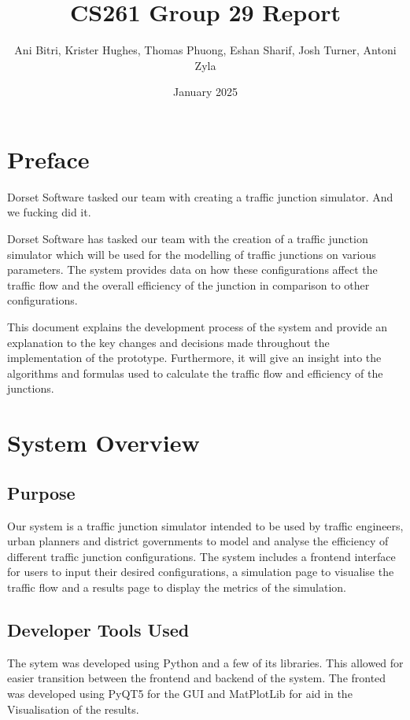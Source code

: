 \documentclass{article}
\title{\vspace{-1.5cm}CS261 Group 29 Report}
\author{Ani Bitri, Krister Hughes, Thomas Phuong, Eshan Sharif, Josh Turner, Antoni Zyla}
\date{January 2025}
\begin{document}
    \maketitle

    \section{Preface}

    Dorset Software tasked our team with creating a traffic junction simulator. And we fucking did it.

    Dorset Software has tasked our team with the creation of a traffic junction simulator which will be used for the modelling of traffic junctions on various parameters. The system provides data on how these configurations
    affect the traffic flow and the overall efficiency of the junction in comparison to other configurations.

    This document explains the development process of the system and provide an explanation to the key changes and decisions made throughout the implementation of the prototype. Furthermore,
    it will give an insight into the algorithms and formulas used to calculate the traffic flow and efficiency of the junctions.


    \section{System Overview}

    \subsection{Purpose}

    Our system is a traffic junction simulator intended to be used by traffic engineers, urban planners and district governments to model and analyse the efficiency of different traffic junction configurations. The
    system includes a frontend interface for users to input their desired configurations, a simulation page to visualise the traffic flow and a results page to display the metrics of the simulation.

    \subsection{Developer Tools Used}

    The sytem was developed using Python and a few of its libraries. This allowed for easier transition between the frontend and backend of the system. The
    fronted was developed using PyQT5 for the GUI and MatPlotLib for aid in the Visualisation of the results.
\end{document}
